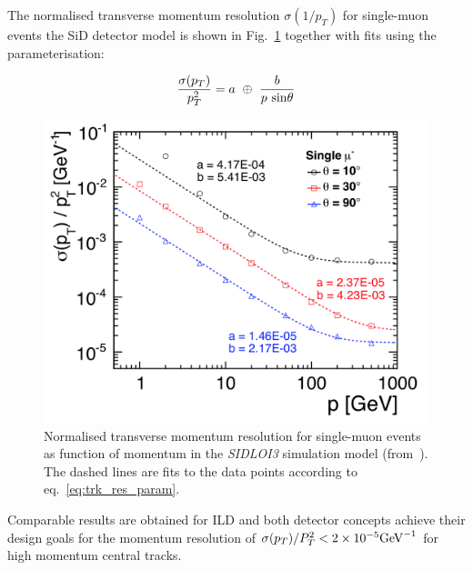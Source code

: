 
The normalised transverse momentum resolution $\sigma(1/p_T)$ for single-muon events the SiD detector model is shown in
Fig.~\ref{fig:sid_mom_res} together with fits using the parameterisation:

\begin{equation}
  \frac{\sigma(p_T)}{p^2_T} = a~\oplus~\frac{b}{p~\rm{sin}\theta}     \label{eq:trk_res_param}
\end{equation}

\begin{figure}
\begin{center}
\includegraphics[width=0.95\hsize]{chapters/figures/SiD_momentum_resolution.png}
\end{center}
\caption{Normalised transverse momentum resolution for single-muon events as function of momentum
  in the \emph{SIDLOI3} simulation model (from~\cite{Behnke:2013lya}). The dashed lines are fits to the data points according
  to eq.~\ref{eq:trk_res_param}.}
\label{fig:sid_mom_res}
\end{figure}

Comparable results are obtained for ILD and both detector concepts achieve their design goals for the momentum resolution of
$\sigma(p_T)/P^2_T  < 2 \times 10^{-5} \rm{GeV}^{-1}$ for high momentum central tracks.

